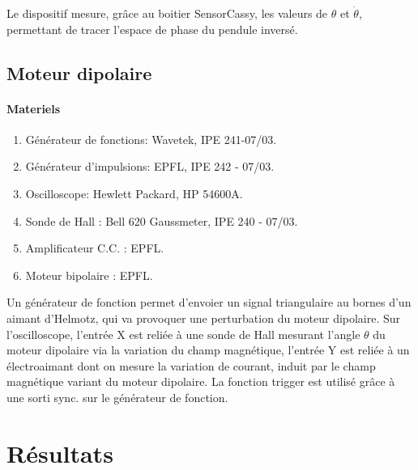 \documentclass[a4paper,12pt,oneside]{article}
\begin{document}
Le dispositif mesure, grâce au boitier SensorCassy, les valeurs de $\theta$ et $\dot{\theta}$,
permettant de tracer l'espace de phase du pendule inversé.

\subsection{Moteur dipolaire}

\paragraph{Materiels}
\begin{enumerate}
	\item Générateur de fonctions: Wavetek, IPE 241-07/03.
	\item Générateur d’impulsions: EPFL, IPE 242 - 07/03.
	\item Oscilloscope: Hewlett Packard, HP 54600A.
	\item Sonde de Hall : Bell 620 Gaussmeter, IPE 240 - 07/03.
	\item Amplificateur C.C. : EPFL.
	\item Moteur bipolaire : EPFL.
\end{enumerate}

\begin{figure}[h!]
  \begin{center}
  \caption{} \label{fig:}
  \end{center}
\end{figure}

Un générateur de fonction permet d'envoier un signal triangulaire au
 bornes d'un aimant d'Helmotz, qui va provoquer une perturbation du
 moteur dipolaire. Sur l'oscilloscope, l'entrée X est reliée à une
 sonde de Hall mesurant l'angle $\theta$ du moteur dipolaire via la variation du champ magnétique,
 l'entrée Y est reliée à un électroaimant dont on
 mesure la variation de courant, induit par le champ magnétique
 variant du moteur dipolaire. La fonction trigger est utilisé grâce
 à une sorti sync. sur le générateur de fonction.

\section{Résultats}

\begin{figure}[h!]
  \begin{center}
  \caption{} \label{fig:}
  \end{center}
\end{figure}
\end{document}

